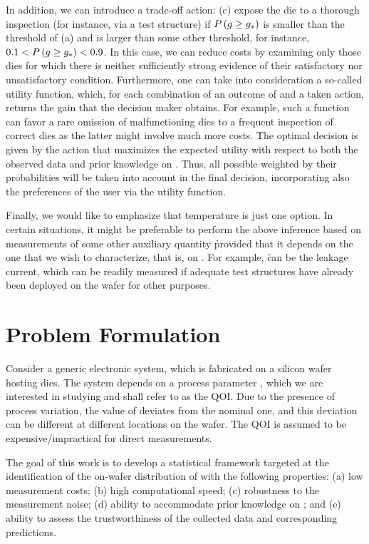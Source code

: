In addition, we can introduce a trade-off action: (c) expose the die to a
thorough inspection (for instance, via a test structure) if $P\left(g
\geq g_*\right)$ is smaller than the threshold of (a) and is larger than some other
threshold, for instance, $0.1 < P\left(g \geq g_*\right) < 0.9$. In this case,
we can reduce costs by examining only those dies for which there is neither
sufficiently strong evidence of their satisfactory nor unsatisfactory condition.
Furthermore, one can take into consideration a so-called utility function,
which, for each combination of an outcome of \g and a taken action, returns the
gain that the decision maker obtains. For example, such a function can favor a
rare omission of malfunctioning dies to a frequent inspection of correct dies as
the latter might involve much more costs. The optimal decision is given by the
action that maximizes the expected utility with respect to both the observed
data and prior knowledge on \g. Thus, all possible \g weighted by their
probabilities will be taken into account in the final decision, incorporating
also the preferences of the user via the utility function.

Finally, we would like to emphasize that temperature is just one option. In
certain situations, it might be preferable to perform the above inference based
on measurements of some other auxiliary quantity \h provided that it depends on
the one that we wish to characterize, that is, on \g. For example, \h can be the
leakage current, which can be readily measured if adequate test structures have
already been deployed on the wafer for other purposes.

\section{Problem Formulation}

Consider a generic electronic system, which is fabricated on a silicon wafer
hosting \nd dies. The system depends on a process parameter \g, which we are
interested in studying and shall refer to as the \ac{QOI}. Due to the presence
of process variation, the value of \g deviates from the nominal one, and this
deviation can be different at different locations on the wafer. The \ac{QOI} is
assumed to be expensive/impractical for direct measurements.

The goal of this work is to develop a statistical framework targeted at the
identification of the on-wafer distribution of \g with the following properties:
(a) low measurement costs; (b) high computational speed; (c) robustness to the
measurement noise; (d) ability to accommodate prior knowledge on \g; and (e)
ability to assess the trustworthiness of the collected data and corresponding
predictions.

